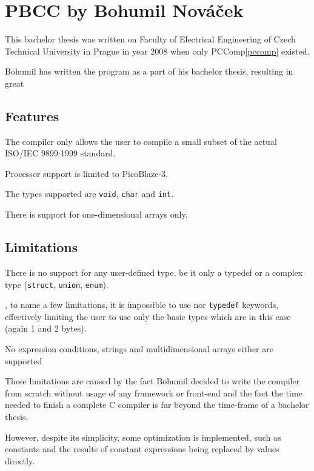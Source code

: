     \section{PBCC by Bohumil Nováček}\label{not_quite_c}

    This bachelor thesis was written on Faculty of Electrical Engineering of Czech Technical University in Prague in year 2008 when only PCComp\ref{pccomp} existed.

    Bohumil has written the program as a part of his bachelor thesis, resulting in great 

        \subsection{Features}

        The compiler only allows the user to compile a small subset of the actual ISO/IEC 9899:1999 standard.

        Processor support is limited to PicoBlaze-3.

        The types supported are \texttt{void}, \texttt{char} and \texttt{int}.

        There is support for one-dimensional arrays only.

        \subsection{Limitations}

        There is no support for any user-defined type, be it only a typedef or a complex type (\texttt{struct}, \texttt{union}, \texttt{enum}).

    ,
    to name a few limitations, it is impossible to use nor \texttt{typedef} keywords, effectively limiting the user to use only the basic types which are in this case  (again 1 and 2 bytes).

    No expression conditions, strings and multidimensional arrays either are supported

    These limitations are caused by the fact Bohumil decided to write the compiler
    from scratch without usage of any framework or front-end and the fact the time needed to finish a complete C compiler is far beyond the time-frame of a bachelor thesis.

    However, despite its simplicity, some optimization is implemented, 
    such as constants and the results of constant expressions being replaced by values directly.

